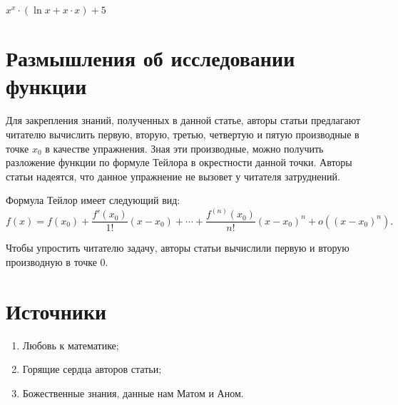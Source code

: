 \documentclass{article}
\begin{document}
$x ^ {x} \cdot ( \ln x + x \cdot x) + 5$\section{Размышления об исследовании функции}

Для закрепления знаний, полученных в данной статье, авторы статьи предлагают читателю вычислить первую, вторую, третью, четвертую и пятую производные в точке $x_0$ в качестве упражнения. Зная эти производные, можно получить разложение функции по формуле Тейлора в окрестности данной точки. Авторы статьи надеятся, что данное упражнение не вызовет у читателя затруднений.

Формула Тейлор имеет следующий вид:
$$f(x) = f(x_0) + \frac{f'(x_0)}{1!}(x - x_0) + \cdots + \frac{f^{(n)}(x_0)}{n!}(x - x_0)^n + o((x - x_0)^n).$$

Чтобы упростить читателю задачу, авторы статьи вычислили первую и вторую производную в точке 0.



\section*{Источники}
\begin{enumerate}
	\item Любовь к математике;
	\item Горящие сердца авторов статьи;
	\item Божественные знания, данные нам Матом и Аном.
\end{enumerate}
\end{document}
